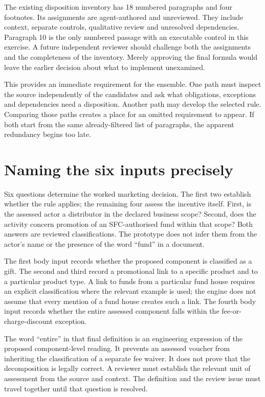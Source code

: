 \documentclass[12pt,a4paper,oneside,openany]{book}
\begin{document}
The existing disposition inventory has 18 numbered paragraphs and four
footnotes. Its assignments are agent-authored and unreviewed. They include
context, separate controls, qualitative review and unresolved dependencies.
Paragraph 10 is the only numbered passage with an executable control in this
exercise. A future independent reviewer should challenge both the assignments
and the completeness of the inventory. Merely approving the final formula would
leave the earlier decision about what to implement unexamined.

This provides an immediate requirement for the ensemble. One path must inspect
the source independently of the candidates and ask what obligations, exceptions
and dependencies need a disposition. Another path may develop the selected
rule. Comparing those paths creates a place for an omitted requirement to
appear. If both start from the same already-filtered list of paragraphs, the
apparent redundancy begins too late.

\section{Naming the six inputs precisely}
\label{merge:M02:02}

\label{sec:circular-inputs}
Six questions determine the worked marketing decision. The first two establish
whether the rule applies; the remaining four assess the incentive itself. First,
is the assessed actor a distributor in the declared business scope? Second, does
the activity concern promotion of an SFC-authorised fund within that scope?
Both answers are reviewed classifications.
The prototype does not infer them from the actor's name or the presence of the
word ``fund'' in a document.

The first body input records whether the proposed component is classified as a
gift. The second and third record a promotional link to a specific product and
to a particular product type. A link to funds from a particular fund house
requires an explicit classification where the relevant example is used; the
engine does not assume that every mention of a fund house creates such a link.
The fourth body input records whether the entire assessed component falls
within the fee-or-charge-discount exception.

The word ``entire'' in that final definition is an engineering expression of
the proposed component-level reading. It prevents an assessed voucher from
inheriting the classification of a separate fee waiver. It does not prove that
the decomposition is legally correct. A reviewer must establish the relevant
unit of assessment from the source and context. The definition and the review
issue must travel together until that question is resolved.
\end{document}
